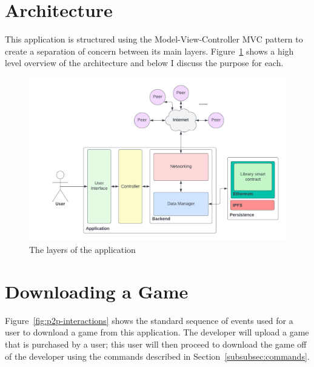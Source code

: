 \section{Architecture}

This application is structured using the Model-View-Controller MVC pattern to create a separation of concern between its main layers. Figure~\ref{fig:impl-layers} shows a high level overview of the architecture and below I discuss the purpose for each.

\begin{figure}[ht]
  \centering
  \includegraphics[width=.8\textwidth]{assets/images/diagrams/layers.png}
  \caption{The layers of the application}
  \label{fig:impl-layers}
\end{figure}






\newpage

\section{Downloading a Game}

Figure~\ref{fig:p2p-interactions} shows the standard sequence of events used for a user to download a game from this application. The developer will upload a game that is purchased by a user; this user will then proceed to download the game off of the developer using the commands described in Section~\ref{subsubsec:commands}.


